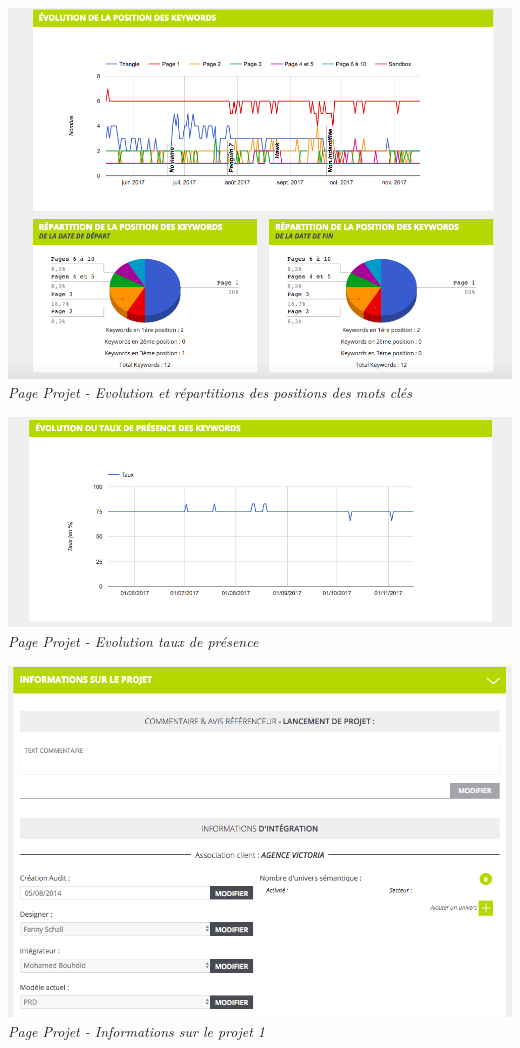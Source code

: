 \documentclass[12pt]{article}
\begin{document}
\begin{appendix}
\begin{center}
    \includegraphics[width = 15cm]{projetData2.png}
    \textit{Page Projet - Evolution et répartitions des positions des mots clés}
    
    \includegraphics[width = 15cm]{projetData3.png}
    \textit{Page Projet - Evolution taux de présence}
    
    \includegraphics[width = 15cm]{projetData4.png}
    \textit{Page Projet - Informations sur le projet 1}
    

\end{center}
\end{appendix}
\end{document}
